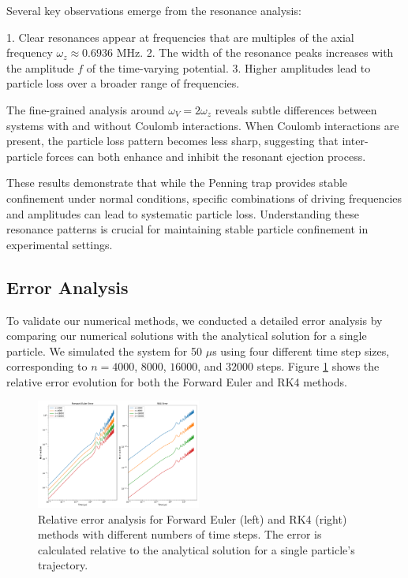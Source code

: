\documentclass[english,notitlepage,reprint,nofootinbib]{revtex4-2}  %
\begin{document}
Several key observations emerge from the resonance analysis:

1. Clear resonances appear at frequencies that are multiples of the axial frequency $\omega_z \approx 0.6936$ MHz.
2. The width of the resonance peaks increases with the amplitude $f$ of the time-varying potential.
3. Higher amplitudes lead to particle loss over a broader range of frequencies.

The fine-grained analysis around $\omega_V = 2\omega_z$ reveals subtle differences between systems with and without Coulomb interactions. When Coulomb interactions are present, the particle loss pattern becomes less sharp, suggesting that inter-particle forces can both enhance and inhibit the resonant ejection process.

These results demonstrate that while the Penning trap provides stable confinement under normal conditions, specific combinations of driving frequencies and amplitudes can lead to systematic particle loss. Understanding these resonance patterns is crucial for maintaining stable particle confinement in experimental settings.
\subsection{Error Analysis}

To validate our numerical methods, we conducted a detailed error analysis by comparing our numerical solutions with the analytical solution for a single particle. We simulated the system for 50 $\mu$s using four different time step sizes, corresponding to $n = 4000$, $8000$, $16000$, and $32000$ steps. Figure \ref{fig:error_analysis} shows the relative error evolution for both the Forward Euler and RK4 methods.

\begin{figure}[h!]
    \centering
    \includegraphics[width=0.48\textwidth]{build/figures/error_analysis.pdf}
    \caption{Relative error analysis for Forward Euler (left) and RK4 (right) methods with different numbers of time steps. The error is calculated relative to the analytical solution for a single particle's trajectory.}
    \label{fig:error_analysis}
\end{figure}
\end{document}
